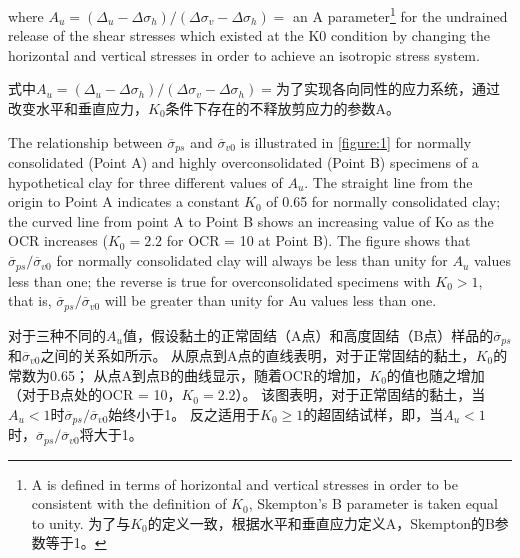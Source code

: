 \begin{paracol}{2}
    
    \noindent{}where $A_u=(\Delta_u-\Delta\sigma_h)/(\Delta\sigma_v-\Delta\sigma_h)=$ an A parameter\footnote{
        A is defined in terms of horizontal and vertical stresses in order to be consistent with the definition of $K_0$, Skempton's B parameter \citep{Skempton1954143} is taken equal to unity. 为了与$K_0$的定义一致，根据水平和垂直应力定义A，Skempton的B参数等于1。} 
    for the undrained release of the shear stresses which existed at the K0 condition by changing the horizontal and vertical stresses in order to achieve an isotropic stress system.

    \switchcolumn

    \noindent{}式中$A_u=(\Delta_u-\Delta\sigma_h)/(\Delta\sigma_v-\Delta\sigma_h)=$为了实现各向同性的应力系统，通过改变水平和垂直应力，$K_0$条件下存在的不释放剪应力的参数A。

    \switchcolumn*

    The relationship between $\overline{\sigma}_{ps}$ and $\overline{\sigma}_{v0}$ is illustrated in \autoref{figure:1} for normally consolidated (Point A) and highly overconsolidated (Point B) specimens of a hypothetical clay for three different values of $A_u$. The straight line from the origin to Point A indicates a constant $K_0$ of 0.65 for normally consolidated clay; the curved line from point A to Point B shows an increasing value of Ko as the OCR increases ($K_0=2.2$ for OCR = 10 at Point B). The figure shows that $\overline{\sigma}_{ps}/\overline{\sigma}_{v0}$ for normally consolidated clay will always be less than unity for $A_u$ values less than one; the reverse is true for overconsolidated specimens with $K_0>1$, that is, $\overline{\sigma}_{ps}/\overline{\sigma}_{v0}$ will be greater than unity for Au values less than one.

    \switchcolumn

    对于三种不同的$A_u$值，假设黏土的正常固结（A点）和高度固结（B点）样品的$\overline{\sigma}_{ps}$和$\overline{\sigma}_{v0}$之间的关系如所示。 从原点到A点的直线表明，对于正常固结的黏土，$K_0$的常数为0.65； 从点A到点B的曲线显示，随着OCR的增加，$K_0$的值也随之增加（对于B点处的OCR = 10，$K_0=2.2$）。 该图表明，对于正常固结的黏土，当$A_u<1$时$\overline{\sigma}_{ps}/\overline{\sigma}_{v0}$始终小于1。 反之适用于$K_0\geq{}1$的超固结试样，即，当$A_u<1$时，$\overline{\sigma}_{ps}/\overline{\sigma}_{v0}$将大于1。
    
\end{paracol}

